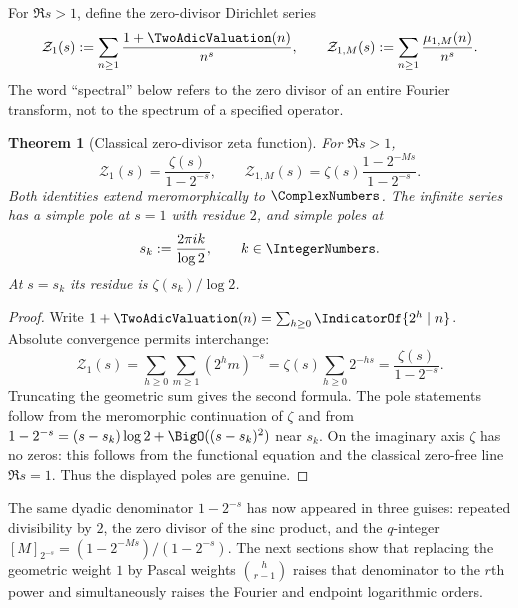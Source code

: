\documentclass[11pt,oneside]{article}
\newtheorem{theorem}{Theorem}[section]
\theoremstyle{definition}
\theoremstyle{remark}
\begin{document}
\begin{definition}
For $\Re s>1$, define the zero-divisor Dirichlet series
\[
  \mathcal Z_1(s):=\sum_{n\ge1}\frac{1+\TwoAdicValuation(n)}{n^s},
  \qquad
  \mathcal Z_{1,M}(s):=\sum_{n\ge1}\frac{\mu_{1,M}(n)}{n^s}.
\]
The word ``spectral'' below refers to the zero divisor of an entire Fourier transform, not to the spectrum of a specified operator.
\end{definition}

\begin{theorem}[Classical zero-divisor zeta function]\label{p3:thm:zeta1}
For $\Re s>1$,
\begin{equation}\label{p3:eq:zeta1}
  \mathcal Z_1(s)=\frac{\zeta(s)}{1-2^{-s}},
  \qquad
  \mathcal Z_{1,M}(s)=\zeta(s)\frac{1-2^{-Ms}}{1-2^{-s}}.
\end{equation}
Both identities extend meromorphically to $\ComplexNumbers$.  The infinite series has a simple pole at $s=1$ with residue $2$, and simple poles at
\begin{equation}\label{p3:eq:dyadic-lattice}
  s_k:=\frac{2\pi i k}{\log2},\qquad k\in\IntegerNumbers.
\end{equation}
At $s=s_k$ its residue is $\zeta(s_k)/\log2$.
\end{theorem}

\begin{proof}
Write $1+\TwoAdicValuation(n)=\sum_{h\ge0}\IndicatorOf{2^h\mid n}$.  Absolute convergence permits interchange:
\[
 \mathcal Z_1(s)=\sum_{h\ge0}\sum_{m\ge1}(2^hm)^{-s}
 =\zeta(s)\sum_{h\ge0}2^{-hs}
 =\frac{\zeta(s)}{1-2^{-s}}.
\]
Truncating the geometric sum gives the second formula.  The pole statements follow from the meromorphic continuation of $\zeta$ and from
$1-2^{-s}=(s-s_k)\log2+\BigO((s-s_k)^2)$ near $s_k$.  On the imaginary axis $\zeta$ has no zeros: this follows from the functional equation and the classical zero-free line $\Re s=1$.  Thus the displayed poles are genuine.
\end{proof}

\begin{resultbox}
The same dyadic denominator $1-2^{-s}$ has now appeared in three guises: repeated divisibility by $2$, the zero divisor of the sinc product, and the $q$-integer $[M]_{2^{-s}}=(1-2^{-Ms})/(1-2^{-s})$.  The next sections show that replacing the geometric weight $1$ by Pascal weights $\binom h{r-1}$ raises that denominator to the $r$th power and simultaneously raises the Fourier and endpoint logarithmic orders.
\end{resultbox}
\end{document}
